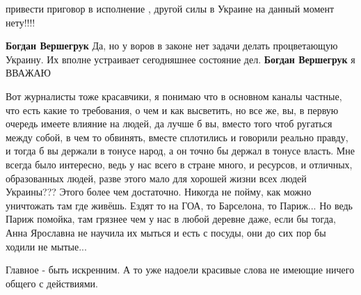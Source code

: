 \begin{itemize}
привести приговор в исполнение , другой силы в Украине на данный момент
нету!!!!
\begin{itemize}
\textbf{Богдан Вершегрук} Да, но у воров в законе нет задачи делать процветающую Украину. Их вполне устраивает сегодняшнее состояние дел.
\textbf{Богдан Вершегрук} я ВВАЖАЮ
\end{itemize}

Вот журналисты тоже красавчики, я понимаю что в основном каналы частные, что
есть какие то требования, о чем и как высветить, но все же, вы, в первую
очередь имеете влияние на людей, да лучше б вы, вместо того чтоб ругаться между
собой, в чем то обвинять, вместе сплотились и говорили реально правду, и тогда
б вы держали в тонусе народ, а он точно бы держал в тонусе власть. Мне всегда
было интересно, ведь у нас всего в стране много, и ресурсов, и отличных,
образованных людей, разве этого мало для хорошей жизни всех людей Украины???
Этого более чем достаточно. Никогда не пойму, как можно уничтожать там где
живёшь. Ездят то на ГОА, то Барселона, то Париж... Но ведь Париж помойка, там
грязнее чем у нас в любой деревне даже, если бы тогда, Анна Ярославна не
научила их мыться и есть с посуды, они до сих пор бы ходили не мытые...

Главное - быть искренним. А то уже надоели красивые слова не имеющие ничего общего с действиями.


\end{itemize}
